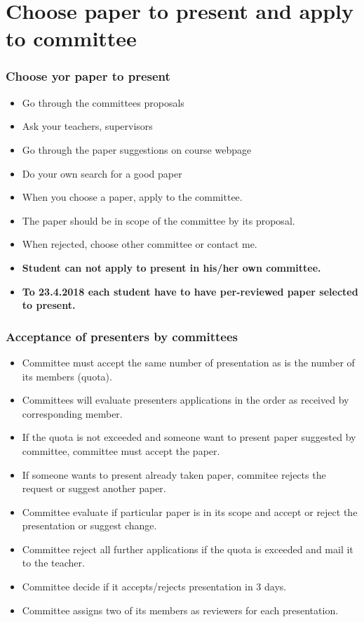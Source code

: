 \section{Choose paper to present and apply to committee}
\begin{frame}
\frametitle{Choose yor paper to present}
\begin{itemize}
\item Go through the committees proposals
\item Ask your teachers, supervisors
\item Go through the paper suggestions on course webpage
\item Do your own search for a good paper
\item When you choose a paper, apply to the committee.
\item The paper should be in scope of the committee by its proposal.
\item When rejected, choose other committee or contact me.
\item \textbf{Student can not apply to present in his/her own committee.}
\item \textbf{To 23.4.2018 each student have to have per-reviewed paper selected to present.}
\end{itemize}
\end{frame}

\begin{frame}
\frametitle{Acceptance of presenters by committees}
\begin{itemize}
\item Committee must accept the same number of presentation as is the number of its members (quota).
\item Committees will evaluate presenters applications in the order as received by corresponding member.
\item If the quota is not exceeded and someone want to present paper suggested by committee, committee must accept the paper.
\item If someone wants to present already taken paper, commitee rejects the request or suggest another paper.
\item Committee evaluate if particular paper is in its scope and accept or reject the presentation or suggest change.
\item Committee reject all further applications if the quota is exceeded and mail it to the teacher.
\item Committee decide if it accepts/rejects presentation in 3 days.
\item Committee assigns two of its members as reviewers for each presentation.
\end{itemize}
\end{frame}
